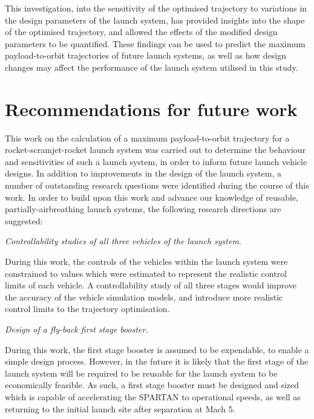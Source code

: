 This investigation, into the sensitivity of the optimised trajectory to variations in the design parameters of the launch system, has provided insights into the shape of the optimised trajectory, and allowed the effects of the modified design parameters to be quantified. These findings can be used to predict the maximum payload-to-orbit trajectories of future launch systems, as well as how design changes may affect the performance of the launch system utilised in this study. 

  \chapter{Recommendations for future work}
 This work on the calculation of a maximum payload-to-orbit trajectory for a rocket-scramjet-rocket launch system was carried out to determine the behaviour and sensitivities of such a launch system, in order to inform future launch vehicle designs. 
 In addition to improvements in the design of the launch system, a number of outstanding research questions were identified during the course of this work.
 In order to build upon this work and advance our knowledge of reusable, partially-airbreathing launch systems, the following research directions are suggested:

\vspace{10pt}
\textit{Controllability studies of all three vehicles of the launch system.}

 \noindent
During this work, the controls of the vehicles within the launch system were constrained to values which were estimated to represent the realistic control limits of each vehicle. 
A controllability study of all three stages would improve the accuracy of the vehicle simulation models, and introduce more realistic control limits to the trajectory optimisation. 

\vspace{10pt}
 \textit{Design of a fly-back first stage booster.}
 
 \noindent
 During this work, the first stage booster is assumed to be expendable, to enable a simple design process. However, in the future it is likely that the first stage of the launch system will be required to be reusable for the launch system to be economically feasible. As such, a first stage booster must be designed and sized which is capable of accelerating the SPARTAN to operational speeds, as well as returning to the initial launch site after separation at Mach 5. 

